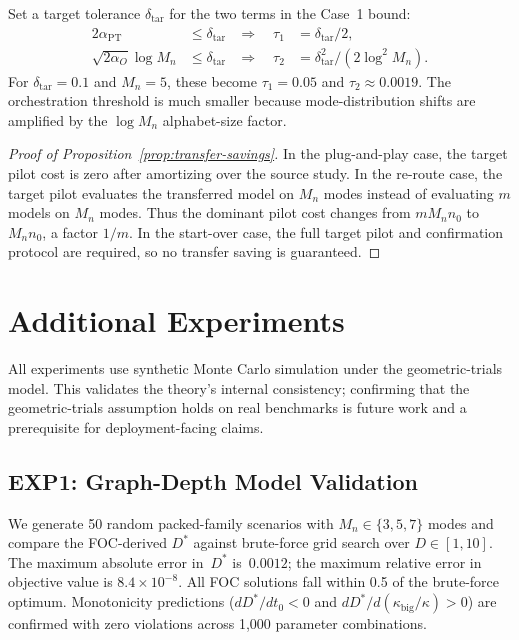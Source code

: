 \documentclass[twoside,11pt]{article}
\newcommand{\Mn}{M_n}
\newcommand{\Dstar}{D^*}
\newcommand{\kappabig}{\kappa_{\mathrm{big}}}
\begin{document}
Set a target tolerance \(\delta_{\mathrm{tar}}\) for the two terms in the Case~1 bound:
\begin{align}
  2\alpha_{\mathrm{PT}} &\le \delta_{\mathrm{tar}}
  &
  \Rightarrow\quad
  \tau_1&=\delta_{\mathrm{tar}}/2,
  \\
  \sqrt{2\alpha_O}\log\Mn &\le \delta_{\mathrm{tar}}
  &
  \Rightarrow\quad
  \tau_2&=\delta_{\mathrm{tar}}^2/(2\log^2\Mn).
\end{align}
For \(\delta_{\mathrm{tar}}=0.1\) and \(\Mn=5\), these become \(\tau_1=0.05\) and \(\tau_2\approx0.0019\).
The orchestration threshold is much smaller because mode-distribution shifts are amplified by the \(\log\Mn\) alphabet-size factor.

\begin{proof}[Proof of Proposition~\ref{prop:transfer-savings}]
In the plug-and-play case, the target pilot cost is zero after amortizing over the source study.
In the re-route case, the target pilot evaluates the transferred model on \(\Mn\) modes instead of evaluating \(m\) models on \(\Mn\) modes.
Thus the dominant pilot cost changes from \(m\Mn n_0\) to \(\Mn n_0\), a factor \(1/m\).
In the start-over case, the full target pilot and confirmation protocol are required, so no transfer saving is guaranteed.
\end{proof}
\section{Additional Experiments}
\label{app:experiments}

All experiments use synthetic Monte Carlo simulation under the geometric-trials model.
This validates the theory's internal consistency; confirming that the geometric-trials assumption holds on real benchmarks is future work and a prerequisite for deployment-facing claims.

\subsection{EXP1: Graph-Depth Model Validation}

We generate 50 random packed-family scenarios with $\Mn \in \{3, 5, 7\}$ modes and compare the FOC-derived $\Dstar$ against brute-force grid search over $D \in [1, 10]$.
The maximum absolute error in~$\Dstar$ is~$0.0012$; the maximum relative error in objective value is $8.4 \times 10^{-8}$.
All FOC solutions fall within 0.5 of the brute-force optimum.
Monotonicity predictions ($d\Dstar/dt_0 < 0$ and $d\Dstar/d(\kappabig/\kappa) > 0$) are confirmed with zero violations across 1{,}000 parameter combinations.
\end{document}
